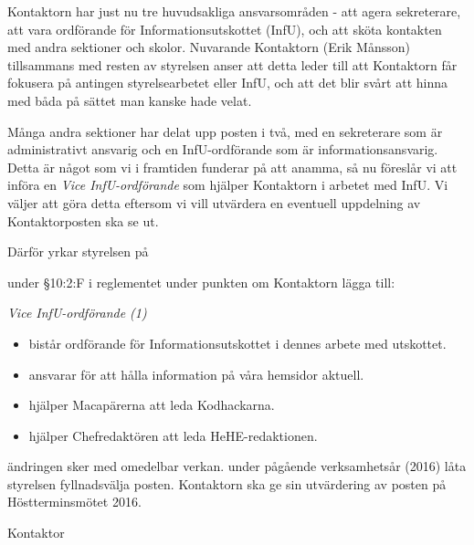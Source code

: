 \documentclass[../_main/handlingar.tex]{subfiles}
\begin{document}

Kontaktorn har just nu tre huvudsakliga ansvarsområden - att agera sekreterare, att vara ordförande för Informationsutskottet (InfU), och att sköta kontakten med andra sektioner och skolor. Nuvarande Kontaktorn (Erik Månsson) tillsammans med resten av styrelsen anser att detta leder till att Kontaktorn får fokusera på antingen styrelsearbetet eller InfU, och att det blir svårt att hinna med båda på sättet man kanske hade velat.

Många andra sektioner har delat upp posten i två, med en sekreterare som är administrativt ansvarig och en InfU-ordförande som är informationsansvarig. Detta är något som vi i framtiden funderar på att anamma, så nu föreslår vi att införa en \emph{Vice InfU-ordförande} som hjälper Kontaktorn i arbetet med InfU. Vi väljer att göra detta eftersom vi vill utvärdera en eventuell uppdelning av Kontaktorposten ska se ut.

Därför yrkar styrelsen på
\begin{attsatser}
    \att under \S10:2:F i reglementet under punkten om Kontaktorn lägga till:\par
    {\it
    Vice InfU-ordförande (1)
    \begin{itemize}[label={--}, topsep=0cm, noitemsep]
        \item bistår ordförande för Informationsutskottet i dennes arbete med utskottet.
        \item ansvarar för att hålla information på våra hemsidor aktuell.
        \item hjälper Macapärerna att leda Kodhackarna.
        \item hjälper Chefredaktören att leda HeHE-redaktionen.
    \end{itemize}
    }
    \att ändringen sker med omedelbar verkan.
    \att under pågående verksamhetsår (2016) låta styrelsen fyllnadsvälja posten.
    \att Kontaktorn ska ge sin utvärdering av posten på Höstterminsmötet 2016.
\end{attsatser}

\begin{signatures}{1}
    \ist
    \signature{Erik Månsson}{Kontaktor}
\end{signatures}
\end{document}
